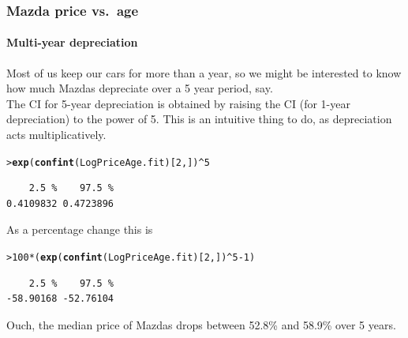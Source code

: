 \documentclass{beamer}\usepackage[]{graphicx}\usepackage[]{xcolor}
\makeatletter
\newcommand{\hlnum}[1]{\textcolor[rgb]{0.686,0.059,0.569}{#1}}%
\newcommand{\hlopt}[1]{\textcolor[rgb]{0,0,0}{#1}}%
\newcommand{\hlstd}[1]{\textcolor[rgb]{0.345,0.345,0.345}{#1}}%
\newcommand{\hlkwd}[1]{\textcolor[rgb]{0.737,0.353,0.396}{\textbf{#1}}}%
\newenvironment{kframe}{%
 \def\at@end@of@kframe{}%
 \ifinner\ifhmode%
  \def\at@end@of@kframe{\end{minipage}}%
  \begin{minipage}{\columnwidth}%
 \fi\fi%
 \def\FrameCommand##1{\hskip\@totalleftmargin \hskip-\fboxsep
 \colorbox{shadecolor}{##1}\hskip-\fboxsep
     \hskip-\linewidth \hskip-\@totalleftmargin \hskip\columnwidth}%
 \MakeFramed {\advance\hsize-\width
   \@totalleftmargin\z@ \linewidth\hsize
   \@setminipage}}%
 {\par\unskip\endMakeFramed%
 \at@end@of@kframe}
\newenvironment{knitrout}{}{} %
\makeatother
\begin{document}
\begin{frame}[fragile]
\frametitle{Mazda price vs.\ age}
\framesubtitle{Multi-year depreciation}
Most of us keep our cars for more than a year, so we might be interested to know how much Mazdas depreciate over a 5 year period, say.\\
\bigskip
The CI for 5-year depreciation is obtained by raising the CI (for 1-year depreciation)
to the power of 5. This is an intuitive thing to do, as depreciation acts multiplicatively.
\begin{knitrout}\scriptsize
{}\color{fgcolor}\begin{kframe}
\begin{alltt}
\hlstd{> }\hlkwd{exp}\hlstd{(}\hlkwd{confint}\hlstd{(LogPriceAge.fit)[}\hlnum{2}\hlstd{,])}\hlopt{^}\hlnum{5}
\end{alltt}
\begin{verbatim}
    2.5 %    97.5 % 
0.4109832 0.4723896 
\end{verbatim}
\end{kframe}
\end{knitrout}
\medskip
As a percentage change this is
\begin{knitrout}\scriptsize
{}\color{fgcolor}\begin{kframe}
\begin{alltt}
\hlstd{> }\hlnum{100}\hlopt{*}\hlstd{(}\hlkwd{exp}\hlstd{(}\hlkwd{confint}\hlstd{(LogPriceAge.fit)[}\hlnum{2}\hlstd{,])}\hlopt{^}\hlnum{5}\hlopt{-}\hlnum{1}\hlstd{)}
\end{alltt}
\begin{verbatim}
    2.5 %    97.5 % 
-58.90168 -52.76104 
\end{verbatim}
\end{kframe}
\end{knitrout}
\medskip
Ouch, the median price of Mazdas drops between 52.8\% and 58.9\% over 5 years.
\end{frame}
\end{document}

